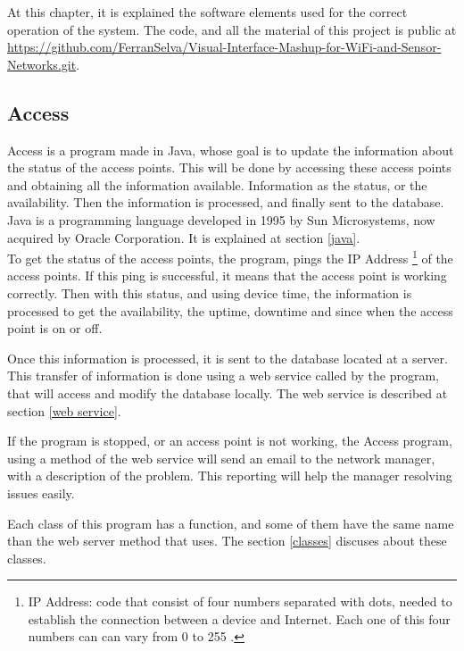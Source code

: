 \documentclass[12pt, a4paper,twoside]{tesi_upf}
\begin{document}
    At this chapter, it is explained the software elements used for the correct operation of the system. The code, and all the material of this project is public at \url{https://github.com/FerranSelva/Visual-Interface-Mashup-for-WiFi-and-Sensor-Networks.git}.
    
        \subsection{Access}
        \label{access}
        
      Access is a program made in Java, whose goal is to update the information about the status of the access points. This will be done by accessing these access points and obtaining all the information available. Information as the status, or the availability. Then the information is processed, and finally sent to the database. \\
        
        Java is a programming language developed in 1995 by Sun Microsystems, now acquired by Oracle Corporation. It is explained at section \ref{java}.\\
        
        To get the status of the access points, the program, pings the IP Address \footnote{IP Address: code that consist of four numbers separated with dots, needed to establish the connection between a device and Internet. Each one of this four numbers can can vary from 0 to 255 \cite{ipa}.} of the access points. If this ping is successful, it means that the access point is working correctly. Then with this status, and using device time, the information is processed to get the availability, the uptime, downtime and since when the access point is on or off. 
        
        Once this information is processed, it is sent to the database located at a server. This transfer of information is done using a web service called by the program, that will access and modify the database locally. The web service is described at section \ref{web service}.
        
If the program is stopped, or an access point is not working, the Access program, using a method of the web service will send an email to the network manager, with a description of the problem. This reporting will help the manager resolving issues easily.
        
        Each class of this program has a function, and some of them have the same name than the web server method that uses. The section \ref{classes} discuses about these classes.\\
        
\end{document}
